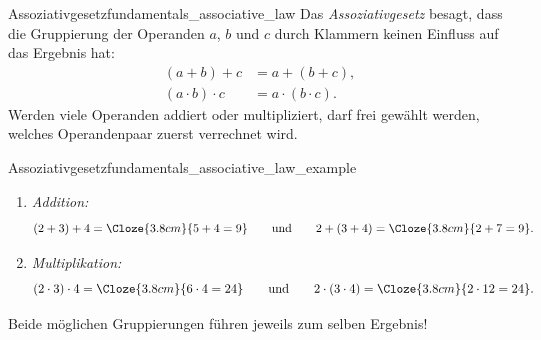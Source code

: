 \noindent\begin{minipage}{\linewidth}
\begin{DefinitionBox}{Assoziativgesetz}{fundamentals_associative_law}
  Das \emph{Assoziativgesetz}  besagt, dass die
  Gruppierung der Operanden $a$, $b$ und $c$ durch Klammern keinen Einfluss auf
  das Ergebnis hat:
  \begin{align*}
    (a+b)+c &= a+(b+c), \\
    (a\cdot b)\cdot c &= a\cdot(b\cdot c).
  \end{align*}
  Werden viele Operanden addiert oder multipliziert, darf frei gewählt werden,
  welches Operandenpaar zuerst verrechnet wird.
\end{DefinitionBox}

\begin{ExampleBox}{Assoziativgesetz}{fundamentals_associative_law_example}
  \begin{enumerate}[label=(\alph*),itemsep=0.8em]
    \item \emph{Addition:}
      \[
        (2+3)+4=\Cloze{3.8cm}{5+4=9}
        \qquad\text{und}\qquad
        2+(3+4)=\Cloze{3.8cm}{2+7=9}.
      \]
    \item \emph{Multiplikation:}
      \[
        (2\cdot 3)\cdot 4=\Cloze{3.8cm}{6\cdot 4=24}
        \qquad\text{und}\qquad
        2\cdot(3\cdot 4)=\Cloze{3.8cm}{2\cdot 12=24}.
      \]
  \end{enumerate}
  Beide möglichen Gruppierungen führen jeweils zum selben Ergebnis!
\end{ExampleBox}
\end{minipage}

\vspace{1cm}

